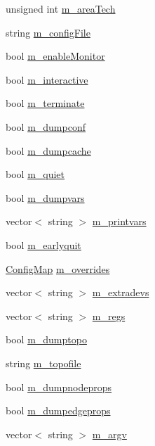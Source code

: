 \begin{DoxyCompactItemize}
\item 
unsigned int \hyperlink{struct_program_config_ab1c91eb479c4bd7b09a2043c26b6327c}{m\+\_\+area\+Tech}
\item 
string \hyperlink{struct_program_config_ae852d51870a2d088c1897dc247a3e5fa}{m\+\_\+config\+File}
\item 
bool \hyperlink{struct_program_config_ae298484b9819aec95b6e73d51327c4aa}{m\+\_\+enable\+Monitor}
\item 
bool \hyperlink{struct_program_config_a9288c154535cdd059657d18429cc4edf}{m\+\_\+interactive}
\item 
bool \hyperlink{struct_program_config_ab47f8c84c95b73b76accfc4e653a9ae5}{m\+\_\+terminate}
\item 
bool \hyperlink{struct_program_config_a2fd70e02cadefc09089610222479cc5f}{m\+\_\+dumpconf}
\item 
bool \hyperlink{struct_program_config_a1819ec3da31552f2b7609542063dc78c}{m\+\_\+dumpcache}
\item 
bool \hyperlink{struct_program_config_a4649e2d4caee5940e25fa433cef4e87a}{m\+\_\+quiet}
\item 
bool \hyperlink{struct_program_config_a4a51f6d259b9005c60a22e2679daf3f3}{m\+\_\+dumpvars}
\item 
vector$<$ string $>$ \hyperlink{struct_program_config_a697d494f09b89f9795128fcfb832c498}{m\+\_\+printvars}
\item 
bool \hyperlink{struct_program_config_a08b8cc45923296fbec9e723046bc5031}{m\+\_\+earlyquit}
\item 
\hyperlink{class_config_map}{Config\+Map} \hyperlink{struct_program_config_a4a73ea59366bb4ab71514aee4e339be1}{m\+\_\+overrides}
\item 
vector$<$ string $>$ \hyperlink{struct_program_config_ae69b789fb17d11b6d4c7f52d1ec99f74}{m\+\_\+extradevs}
\item 
vector$<$ string $>$ \hyperlink{struct_program_config_a88d264b7eb38611c33f6468049058990}{m\+\_\+regs}
\item 
bool \hyperlink{struct_program_config_a70a4373acc903d68a8c84e9da6bb9a24}{m\+\_\+dumptopo}
\item 
string \hyperlink{struct_program_config_a87b9ea2013de37dd8fc569704cd033f6}{m\+\_\+topofile}
\item 
bool \hyperlink{struct_program_config_a6ab98aefb2ccf9e18726c7f3f9e30b28}{m\+\_\+dumpnodeprops}
\item 
bool \hyperlink{struct_program_config_a19cd36d74c2dfd6e62b73a54a3021fac}{m\+\_\+dumpedgeprops}
\item 
vector$<$ string $>$ \hyperlink{struct_program_config_a790c5c5dac05965fa5c0bc05d15974df}{m\+\_\+argv}
\end{DoxyCompactItemize}


